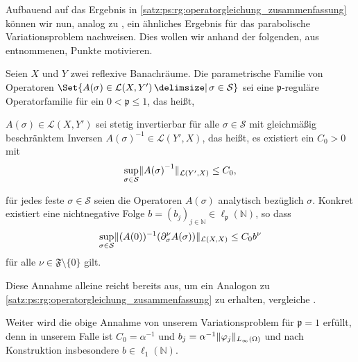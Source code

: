 Aufbauend auf das Ergebnis in \cref{satz:ps:rg:operatorgleichung_zusammenfassung} können wir nun, analog zu \textcite[Section 4]{Kunoth:2013ef}, ein ähnliches Ergebnis für das parabolische Variationsproblem nachweisen.
Dies wollen wir anhand der folgenden, aus \cite{Kunoth:2013ef} entnommenen, Punkte motivieren.

\begin{Annahme}
\label{ann:ps:rg:kunoth13_assumption1}
    Seien $X$ und $Y$ zwei reflexive Banachräume.
    Die parametrische Familie von Operatoren
    $\Set{ A(\sigma) \in \mathcal L(X, Y') \given \sigma \in \mathcal S }$ sei eine $\mathfrak p$-reguläre Operatorfamilie für ein $0 < \mathfrak p \leq 1$, das heißt,
    \begin{thmenumerate}
        \item $A(\sigma) \in \mathcal L(X, Y')$ sei stetig invertierbar für alle $\sigma \in \mathcal S$ mit gleichmäßig beschränktem Inversen $A{(\sigma)}^{-1} \in \mathcal L(Y', X)$, das heißt, es existiert ein $C_{0} > 0$ mit
        \begin{equation}
            \sup_{\sigma \in \mathcal S} \lVert A{(\sigma)}^{-1}\rVert_{\mathcal L(Y', X)} \leq C_{0},
        \end{equation}
        \item für jedes feste $\sigma \in \mathcal S$ seien die Operatoren $A(\sigma)$ analytisch bezüglich $\sigma$.
        Konkret existiert eine nichtnegative Folge $b = (b_{j})_{j \in \mathbb{N}} \in \ell_{\mathfrak p}(\mathbb{N})$, so dass
        \begin{equation}
            \sup_{\sigma \in \mathcal S} \lVert(A{(0)})^{-1}(\partial^{\nu}_{\sigma} A(\sigma))\rVert_{\mathcal L(X, X)} \leq C_{0} b^{\nu}
        \end{equation}
        für alle $\nu \in \mathfrak F \setminus \{ 0 \}$ gilt.
    \end{thmenumerate}
\end{Annahme}
%
Diese Annahme alleine reicht bereits aus, um ein Analogon zu \cref{satz:ps:rg:operatorgleichung_zusammenfassung} zu erhalten, vergleiche \cite[Theorem 4]{Kunoth:2013ef}.

Weiter wird die obige Annahme von unserem Variationsproblem für $\mathfrak p = 1$ erfüllt, denn in unserem Falle ist $C_{0} = \alpha^{-1}$ und $b_{j} = \alpha^{-1} \lVert\varphi_{j}\rVert_{L_{\infty}(\Omega)}$ und nach Konstruktion insbesondere $b \in \ell_{1}(\mathbb{N})$.


